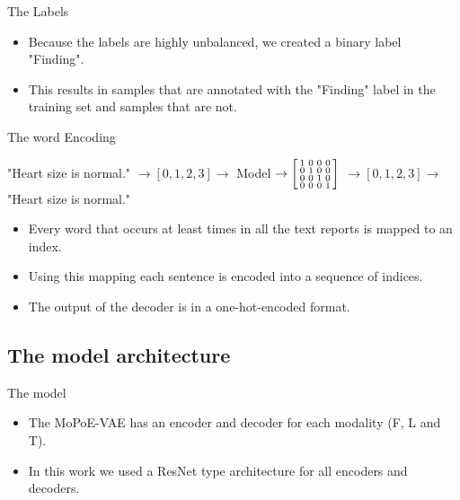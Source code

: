     \begin{frame}
    \end{frame}

    \begin{frame}{The Labels}
    \begin{itemize}
        \item Because the labels are highly unbalanced, we created a binary label "Finding".
        \item This results in  samples that are annotated with the "Finding" label in the training set and  samples that are not.
    \end{itemize}
    \end{frame}

    \begin{frame}{The word Encoding}
        
        \small{
        "Heart size is normal." $\rightarrow [0,1,2,3] \rightarrow$ Model $\rightarrow
        \begin{bsmallmatrix}
            1 & 0 & 0 & 0\\
            0 & 1 & 0 & 0\\
            0 & 0 & 1 & 0\\
            0 & 0 & 0 & 1\\
        \end{bsmallmatrix}$
        $\rightarrow [0,1,2,3] \rightarrow$ "Heart size is normal."}\\
        \vspace{\baselineskip}
        \pause
        \begin{itemize}
            \item Every word that occurs at least  times in all the text reports is mapped to an index. 
            \pause
            \item Using this mapping each sentence is encoded into a sequence of indices.
            \pause
            \item The output of the decoder is in a one-hot-encoded format.
        \end{itemize}
    \end{frame}

    \subsection{The model architecture}
    \begin{frame}{The model}
        \begin{itemize}
            \item The MoPoE-VAE has an encoder and decoder for each modality (F, L and T).
            \pause
            \item In this work we used a ResNet type architecture for all encoders and decoders.
        \end{itemize}

    \end{frame}

